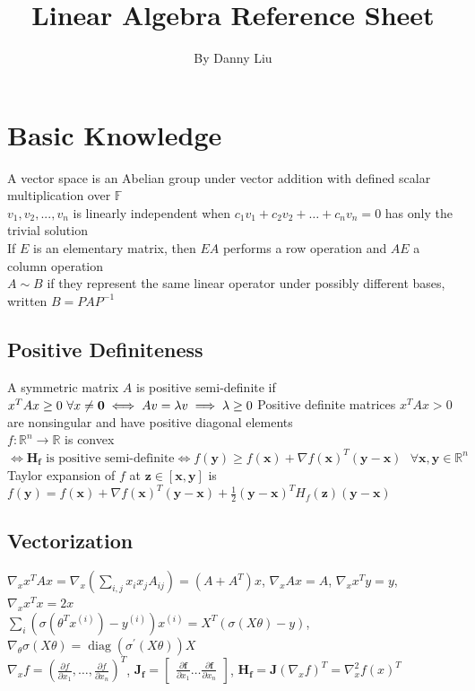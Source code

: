 \documentclass{article}
\title{Linear Algebra Reference Sheet}
\author{By Danny Liu}
\date{}
\DeclareMathOperator{\diag}{diag}
\newcommand{\F}{\mathbb{F}}
\newcommand{\real}{\mathbb{R}}
\begin{document}
\maketitle

\section{Basic Knowledge}
A vector space is an Abelian group under vector addition with defined scalar multiplication over $\F$ \\
$v_1, v_2, ..., v_n$ is linearly independent when $c_1v_1 + c_2v_2 + \ldots + c_nv_n = 0$ has only the trivial solution\\
If $E$ is an elementary matrix, then $EA$ performs a row operation and $AE$ a column operation \\
$A \sim B$ if they represent the same linear operator under possibly different bases, written ${B = PAP^{-1}}$  

\subsection{Positive Definiteness}
A symmetric matrix $A$ is positive semi-definite if $x^TAx \geq 0 \mbox{ } \forall x \neq \boldsymbol{0} \iff Av = \lambda v \implies \lambda \geq 0 \\$
Positive definite matrices $x^TAx > 0$ are nonsingular and have positive diagonal elements \\
$f: \real^n \rightarrow \real$ is convex $\iff {\boldsymbol{H}_{\boldsymbol{f}} \mbox{ is positive semi-definite} \iff f(\boldsymbol{y}) \geq f(\boldsymbol{x}) + {\nabla f(\boldsymbol{x})}^T (\boldsymbol{y}-\boldsymbol{x}) \mbox{ }\forall \boldsymbol{x}, \boldsymbol{y} \in \real^n }$\\
Taylor expansion of $f$ at $\boldsymbol{z} \in [\boldsymbol{x}, \boldsymbol{y}]$ is $f(\boldsymbol{y}) =  f(\boldsymbol{x}) + {\nabla f(\boldsymbol{x})}^T (\boldsymbol{y}-\boldsymbol{x}) + \frac{1}{2}(\boldsymbol{y}-\boldsymbol{x})^TH_f(\boldsymbol{z})(\boldsymbol{y}-\boldsymbol{x})$

\subsection{Vectorization}
$\nabla_x x^TAx = \nabla_x (\sum_{i, j}x_i x_j A_{ij}) = (A + A^T)x$, $\nabla_x Ax = A$, $\nabla_x x^Ty = y$, $\nabla_x x^Tx = 2x$ \\
$\sum_i(\sigma(\theta^Tx^{(i)}) - y^{(i)})x^{(i)} = X^T(\sigma(X\theta) - y)$, $\nabla_\theta \sigma(X\theta) = \diag(\sigma^\prime (X\theta))X$ \\
$\nabla_x f = (\frac{\partial f}{\partial x_1}, \ldots , \frac{\partial f}{\partial x_n})^T$, $\boldsymbol{J}_{\boldsymbol{f}} = \begin{bmatrix} \frac{\partial \boldsymbol{f}}{\partial x_1} \ldots \frac{\partial \boldsymbol{f}}{\partial x_n} \end{bmatrix}$, $\boldsymbol{H}_{\boldsymbol{f}} = \boldsymbol{J}(\nabla_x f)^T = \nabla_x^2f(x)^T$
\end{document}
